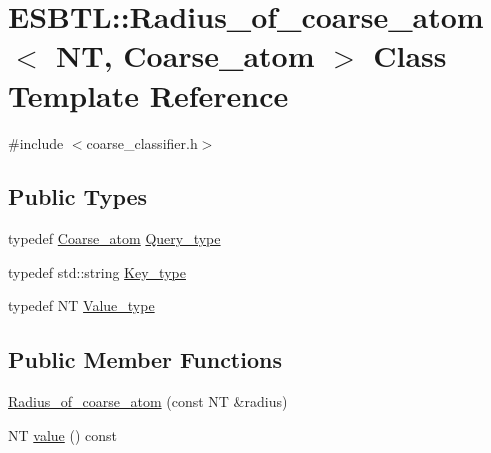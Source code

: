 \hypertarget{classESBTL_1_1Radius__of__coarse__atom}{}\section{E\+S\+B\+TL\+:\+:Radius\+\_\+of\+\_\+coarse\+\_\+atom$<$ NT, Coarse\+\_\+atom $>$ Class Template Reference}
\label{classESBTL_1_1Radius__of__coarse__atom}


{\ttfamily \#include $<$coarse\+\_\+classifier.\+h$>$}

\subsection*{Public Types}
\begin{DoxyCompactItemize}
\item 
typedef \hyperlink{classESBTL_1_1Coarse__atom}{Coarse\+\_\+atom} \hyperlink{classESBTL_1_1Radius__of__coarse__atom_acbb080cc53888dc8ee71551a06921e7d}{Query\+\_\+type}
\item 
typedef std\+::string \hyperlink{classESBTL_1_1Radius__of__coarse__atom_ade5e52860ae3bd455e1797394fb111c3}{Key\+\_\+type}
\item 
typedef NT \hyperlink{classESBTL_1_1Radius__of__coarse__atom_a6e2d08b3508edda6ae66f13af0260328}{Value\+\_\+type}
\end{DoxyCompactItemize}
\subsection*{Public Member Functions}
\begin{DoxyCompactItemize}
\item 
\hyperlink{classESBTL_1_1Radius__of__coarse__atom_ab2f5a49cea6b6ec893e057d766ebc4be}{Radius\+\_\+of\+\_\+coarse\+\_\+atom} (const NT \&radius)
\item 
NT \hyperlink{classESBTL_1_1Radius__of__coarse__atom_af7e4c44f516494dab26eb9bf1aad4340}{value} () const
\end{DoxyCompactItemize}
